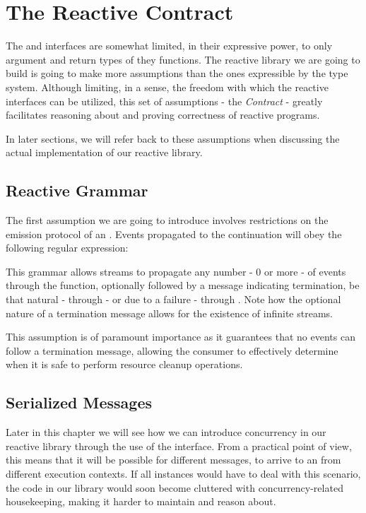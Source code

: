 \section{The Reactive Contract}
\label{sec:contract}

The  and  interfaces are somewhat limited, in their expressive power, to only argument and return types of they functions. The reactive library we are going to build is going to make more assumptions than the ones expressible by the type system. Although limiting, in a sense, the freedom with which the reactive interfaces can be utilized, this set of assumptions - the \textit{Contract} - greatly facilitates reasoning about and proving correctness of reactive programs\cite{MS2010-RxDesign}.

In later sections, we will refer back to these assumptions when discussing the actual implementation of our reactive library.

\subsection{Reactive Grammar}
\label{ass-grammar}
The first assumption we are going to introduce involves restrictions on the emission protocol of an . Events propagated to the  continuation will obey the following regular expression:

\begin{center}\end{center}

This grammar allows streams to propagate any number - 0 or more - of events through the  function, optionally followed by a message indicating termination, be that natural - through  - or due to a failure - through . Note how the optional nature of a termination message allows for the existence of infinite streams. 

This assumption is of paramount importance as it guarantees that no events can follow a termination message, allowing the consumer to effectively determine when it is safe to perform resource cleanup operations. 

\subsection{Serialized Messages}
\label{ass-serialized}
Later in this chapter we will see how we can introduce concurrency in our reactive library through the use of the  interface. From a practical point of view, this means that it will be possible for different messages, to arrive to an  from different execution contexts. If all  instances would have to deal with this scenario, the code in our library would soon become cluttered with concurrency-related housekeeping, making it harder to maintain and reason about.


